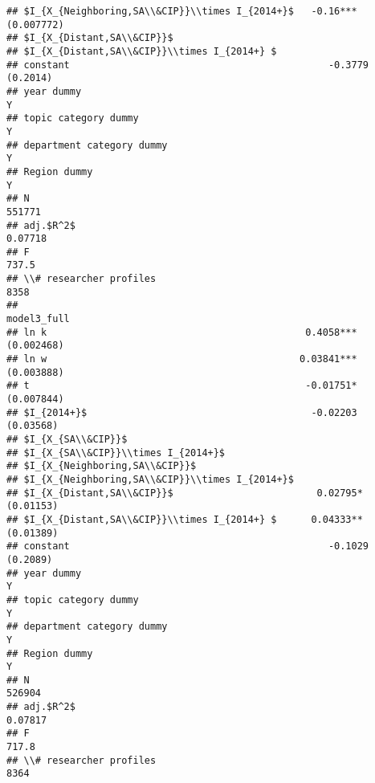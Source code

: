 \documentclass[
]{article}
\begin{document}
\begin{verbatim}
## $I_{X_{Neighboring,SA\\&CIP}}\\times I_{2014+}$   -0.16*** (0.007772)
## $I_{X_{Distant,SA\\&CIP}}$                                           
## $I_{X_{Distant,SA\\&CIP}}\\times I_{2014+} $                         
## constant                                             -0.3779 (0.2014)
## year dummy                                                          Y
## topic category dummy                                                Y
## department category dummy                                           Y
## Region dummy                                                        Y
## N                                                              551771
## adj.$R^2$                                                     0.07718
## F                                                               737.5
## \\# researcher profiles                                          8358
##                                                           model3_full
## ln k                                             0.4058*** (0.002468)
## ln w                                            0.03841*** (0.003888)
## t                                                -0.01751* (0.007844)
## $I_{2014+}$                                       -0.02203  (0.03568)
## $I_{X_{SA\\&CIP}}$                                                   
## $I_{X_{SA\\&CIP}}\\times I_{2014+}$                                  
## $I_{X_{Neighboring,SA\\&CIP}}$                                       
## $I_{X_{Neighboring,SA\\&CIP}}\\times I_{2014+}$                      
## $I_{X_{Distant,SA\\&CIP}}$                         0.02795* (0.01153)
## $I_{X_{Distant,SA\\&CIP}}\\times I_{2014+} $      0.04333** (0.01389)
## constant                                             -0.1029 (0.2089)
## year dummy                                                          Y
## topic category dummy                                                Y
## department category dummy                                           Y
## Region dummy                                                        Y
## N                                                              526904
## adj.$R^2$                                                     0.07817
## F                                                               717.8
## \\# researcher profiles                                          8364
\end{verbatim}
\end{document}
